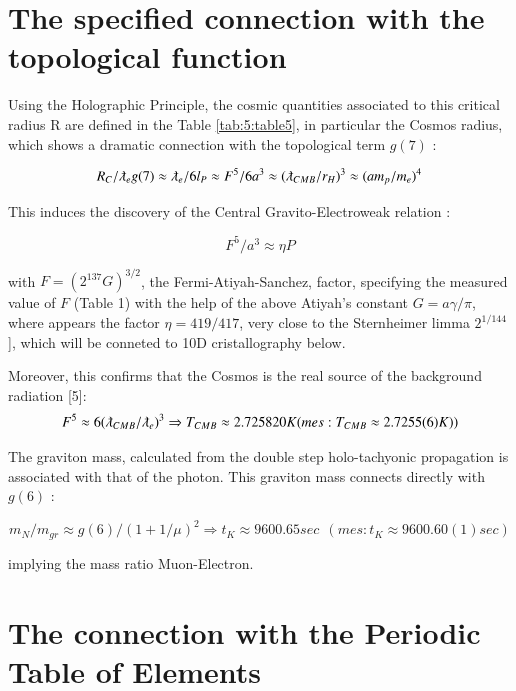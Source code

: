 \documentclass[a4paper,9pt]{article}
\begin{document}
\section{The specified connection with the topological function}

Using the Holographic Principle, the cosmic quantities associated to this critical radius R are defined in the Table \ref{tab:5:table5}, in particular the Cosmos radius, which shows a dramatic connection with the topological term $g(7)$ :

\begin{equation}
R_{C}/\lambdabar_{e} g(7) \approx  \lambdabar_{e}/6l_P \approx F^5/6a^3 \approx (\lambdabar_{CMB}/r_H)^3 \approx  (am_p/m_e)^4  
\end{equation}

This induces the discovery of the Central Gravito-Electroweak relation :

\begin{equation*}
F^5/a^3 \approx \eta P    
\end{equation*}{}
  

with  $F = (2^137 G)^{3/2}$, the Fermi-Atiyah-Sanchez, factor, specifying the measured value of  $F$ (Table 1) with the help of the above Atiyah's constant $G = a \gamma/ \pi$, where appears the factor $\eta = 419/417$, very close to the Sternheimer limma $2^{1/144}$ \cite{Sternheimer}], which will be conneted to 10D cristallography below.


Moreover, this confirms that the Cosmos is the real source of the background radiation [5]:
\begin{equation}
F^5  \approx 6(\lambdabar_{CMB}/\lambdabar_{e})^3 \Rightarrow  T_{CMB}  \approx  2.725820 K  (mes : T_{CMB}  \approx  2.7255(6) K)) 
\end{equation}


The graviton mass, calculated from the double step holo-tachyonic propagation is associated with that of the photon. This graviton mass connects directly with $g(6)$ :

\begin{equation}
m_N/m_{gr} \approx g(6)/(1+1/\mu)^2 \Rightarrow    t_K  \approx  9600.65 sec ~~(mes : t_K \approx 9600.60(1) sec)    
\end{equation}

implying the mass ratio Muon-Electron. 


\section{The connection with the Periodic Table of Elements}
\end{document}
